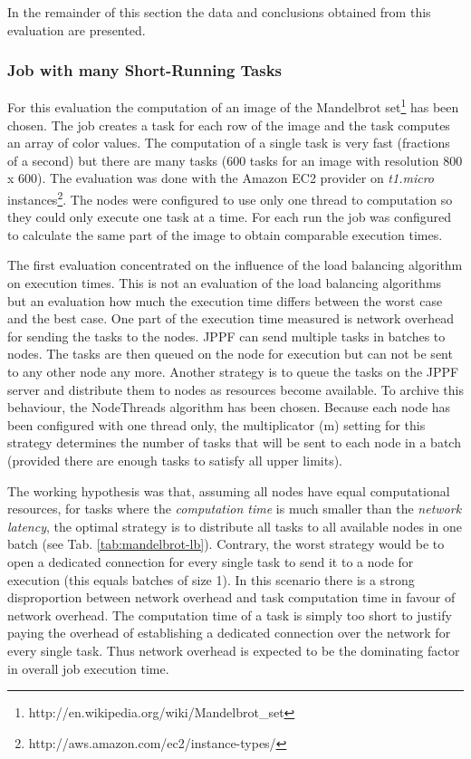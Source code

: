 \documentclass[english]{uzhpub}
\begin{document}
In the remainder of this section the data and conclusions obtained from this evaluation are presented.

\subsubsection{Job with many Short-Running Tasks}
\label{short-tasks}

For this evaluation the computation of an image of the Mandelbrot set\footnote{http://en.wikipedia.org/wiki/Mandelbrot\_set} has been chosen. The job creates a task for each row of the image and the task computes an array of color values. The computation of a single task is very fast (fractions of a second) but there are many tasks (600 tasks for an image with resolution 800 x 600). The evaluation was done with the Amazon EC2 provider on \textit{t1.micro} instances\footnote{http://aws.amazon.com/ec2/instance-types/}. The nodes were configured to use only one thread to computation so they could only execute one task at a time. For each run the job was configured to calculate the same part of the image to obtain comparable execution times. 

The first evaluation concentrated on the influence of the load balancing algorithm on execution times. This is not an evaluation of the load balancing algorithms but  an evaluation how much the execution time differs between the worst case and the best case. One part of the execution time measured is network overhead for sending the tasks to the nodes. JPPF can send multiple tasks in batches to nodes. The tasks are then queued on the node for execution but can not be sent to any other node any more. Another strategy is to queue the tasks on the JPPF server and distribute them to nodes as resources become available. To archive this behaviour, the NodeThreads algorithm has been chosen. Because each node has been configured with one thread only, the multiplicator (m) setting for this strategy determines the number of tasks that will be sent to each node in a batch (provided there are enough tasks to satisfy all upper limits).

The working hypothesis was that, assuming all nodes have equal computational resources, for tasks where the \textit{computation time} is much smaller than the \textit{network latency}, the optimal strategy is to distribute all tasks to all available nodes in one batch (see Tab. \ref{tab:mandelbrot-lb}). Contrary, the worst strategy would be to open a dedicated connection for every single task to send it to a node for execution (this equals batches of size 1). In this scenario there is a strong disproportion between network overhead and task computation time in favour of network overhead. The computation time of a task is simply too short to justify paying the overhead of establishing a dedicated connection over the network for every single task. Thus network overhead is expected to be the dominating factor in overall job execution time.
\end{document}
